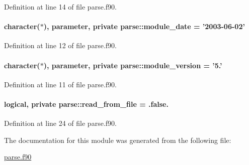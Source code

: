 Definition at line 14 of file parse.\-f90.

\hypertarget{classparse_a58e790a1b3fb15a5bf452bed72824bb5}{
\paragraph[{module\-\_\-date}]{\setlength{\rightskip}{0pt plus 5cm}character($\ast$), parameter, private parse\-::module\-\_\-date = '2003-\/06-\/02'\hspace{0.3cm}{\ttfamily [private]}}}\label{classparse_a58e790a1b3fb15a5bf452bed72824bb5}


Definition at line 12 of file parse.\-f90.

\hypertarget{classparse_aa3d8a423d5bb7625e5a7ec62411e1d27}{
\paragraph[{module\-\_\-version}]{\setlength{\rightskip}{0pt plus 5cm}character($\ast$), parameter, private parse\-::module\-\_\-version = '5.'\hspace{0.3cm}{\ttfamily [private]}}}\label{classparse_aa3d8a423d5bb7625e5a7ec62411e1d27}


Definition at line 11 of file parse.\-f90.

\hypertarget{classparse_a05b49575e8cecd7362ce03a284f6ba95}{
\paragraph[{read\-\_\-from\-\_\-file}]{\setlength{\rightskip}{0pt plus 5cm}logical, private parse\-::read\-\_\-from\-\_\-file = .false.\hspace{0.3cm}{\ttfamily [private]}}}\label{classparse_a05b49575e8cecd7362ce03a284f6ba95}


Definition at line 24 of file parse.\-f90.



The documentation for this module was generated from the following file\-:\begin{DoxyCompactItemize}
\item 
\hyperlink{parse_8f90}{parse.\-f90}\end{DoxyCompactItemize}
